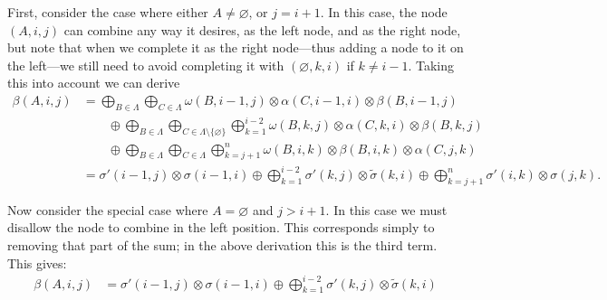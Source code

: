     First, consider the case where either $A \neq \varnothing$, or $j = i + 1$. In this case, the node $(A, i, j)$ can combine any way it desires, as the left node, and as the right node, but note that when we complete it as the right node---thus adding a node to it on the left---we still need to avoid completing it with $(\varnothing, k, i)$ if $k \neq i-1$. Taking this into account we can derive
    \begin{align*}
      \beta(A, i, j)
        &= \bigoplus_{B \in \Lambda} \bigoplus_{C \in \Lambda}  \omega(B, i-1, j) \otimes \alpha(C, i-1, i) \otimes \beta(B, i-1, j)  \\
          &\qquad \oplus \bigoplus_{B \in \Lambda} \bigoplus_{C \in \Lambda \setminus \{ \varnothing \}} \bigoplus_{k=1}^{i-2} \omega(B, k, j) \otimes \alpha(C, k, i) \otimes \beta(B, k, j) \\
          &\qquad \oplus \bigoplus_{B \in \Lambda} \bigoplus_{C \in \Lambda} \bigoplus_{k=j+1}^{n} \omega(B, i, k) \otimes \beta(B, i, k) \otimes \alpha(C, j, k)  \\
        &= \sigma'(i-1, j) \otimes \sigma(i-1, i) \oplus \bigoplus_{k=1}^{i-2} \sigma'(k, j) \otimes \tilde{\sigma}(k, i) \oplus \bigoplus_{k=j+1}^{n} \sigma'(i, k) \otimes \sigma(j, k).
    \end{align*}

    Now consider the special case where $ A = \varnothing$ and $j > i + 1$. In this case we must disallow the node to combine in the left position. This corresponds simply to removing that part of the sum; in the above derivation this is the third term. This gives:
    \begin{align*}
      \beta(A, i, j) &=
        \sigma'(i-1, j) \otimes \sigma(i-1, i) \oplus \displaystyle\bigoplus_{k=1}^{i-2} \sigma'(k, j) \otimes \tilde{\sigma}(k, i)
    \end{align*}


